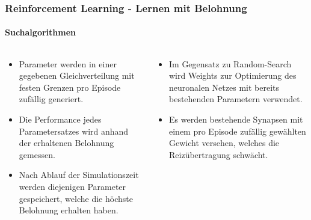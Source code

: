\documentclass[10pt,t,aspectratio=1610]{beamer}
\newcommand{\ChapterRl}{Reinforcement Learning - Lernen mit Belohnung}
\begin{document}
\begin{frame}
	\frametitle{\ChapterRl}
	\framesubtitle{Suchalgorithmen}
	\vspace{0.3cm}
	\begin{columns}[T,onlytextwidth]
		\begin{column}{0.5\textwidth}
			\vspace{0.1cm}
			\begin{itemize}
				\item Parameter werden in einer gegebenen Gleichverteilung mit festen Grenzen pro Episode zufällig generiert.
				\item Die Performance jedes Parametersatzes wird anhand der erhaltenen Belohnung gemessen.
				\item Nach Ablauf der Simulationszeit werden diejenigen Parameter gespeichert, welche die höchste Belohnung erhalten haben.
			\end{itemize}
		\end{column}
		\begin{column}{0.5\textwidth}
			\vspace{0.1cm}
			\begin{itemize}
				\item Im Gegensatz zu Random-Search wird Weights zur Optimierung des neuronalen Netzes mit bereits bestehenden Parametern verwendet.
				\item Es werden bestehende Synapsen mit einem pro Episode zufällig gewählten Gewicht versehen, welches die Reizübertragung schwächt.
			\end{itemize}
		\end{column}
	\end{columns}
\end{frame}

\end{document}
